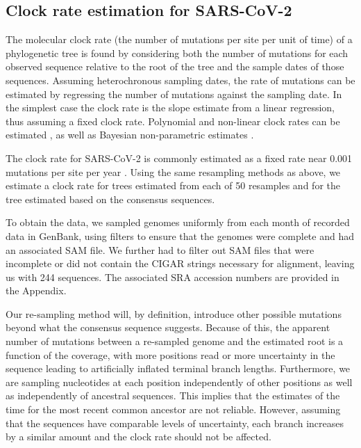 \documentclass[12pt]{article}
\begin{document}
\subsection{Clock rate estimation for SARS-CoV-2}

The molecular clock rate (the number of mutations per site per unit of time) of a phylogenetic tree is found by considering both the number of mutations for each observed sequence relative to the root of the tree and the sample dates of those sequences.
Assuming heterochronous sampling dates, the rate of mutations can be estimated by regressing the number of mutations against the sampling date.
In the simplest case the clock rate is the slope estimate from a linear regression, thus assuming a fixed clock rate.
Polynomial and non-linear clock rates can be estimated \cite{sagulenkoTreeTimeMaximumlikelihoodPhylodynamic2018}, as well as Bayesian non-parametric estimates \cite{drummondBayesianEvolutionaryAnalysis2015}. 

The clock rate for SARS-CoV-2 is commonly estimated as a fixed rate near 0.001 mutations per site per year \cite{ducheneTemporalSignalPhylodynamic2020, choudharySevereAcuteRespiratory2021, songGenomicEpidemiologySARSCoV22021, niePhylogeneticPhylodynamicAnalyses2020, geidelbergGenomicEpidemiologyDensely2021}.
Using the same resampling methods as above, we estimate a clock rate for trees estimated from each of 50 resamples and for the tree estimated based on the consensus sequences.

To obtain the data, we sampled genomes uniformly from each month of recorded data in GenBank, using filters to ensure that the genomes were complete and had an associated SAM file.
We further had to filter out SAM files that were incomplete or did not contain the CIGAR strings necessary for alignment, leaving us with 244 sequences.
The associated SRA accession numbers are provided in the Appendix.

Our re-sampling method will, by definition, introduce other possible mutations beyond what the consensus sequence suggests.
Because of this, the apparent number of mutations between a re-sampled genome and the estimated root is a function of the coverage, with more positions read or more uncertainty in the sequence leading to artificially inflated terminal branch lengths.
Furthermore, we are sampling nucleotides at each position independently of other positions as well as independently of ancestral sequences.
This implies that the estimates of the time for the most recent common ancestor are not reliable.
However, assuming that the sequences have comparable levels of uncertainty, each branch increases by a similar amount and the clock rate should not be affected.
\end{document}
